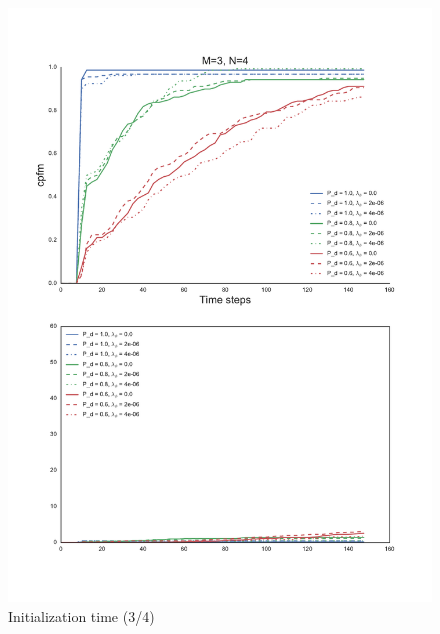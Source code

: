 \begin{figure}
\centering
\includegraphics[height = .9\textheight]{Figures/plots/Scenario1_Init-Time(3-4).pdf}
\caption{Initialization time (3/4)}\label{fig:init_time_3-4}
\end{figure}

